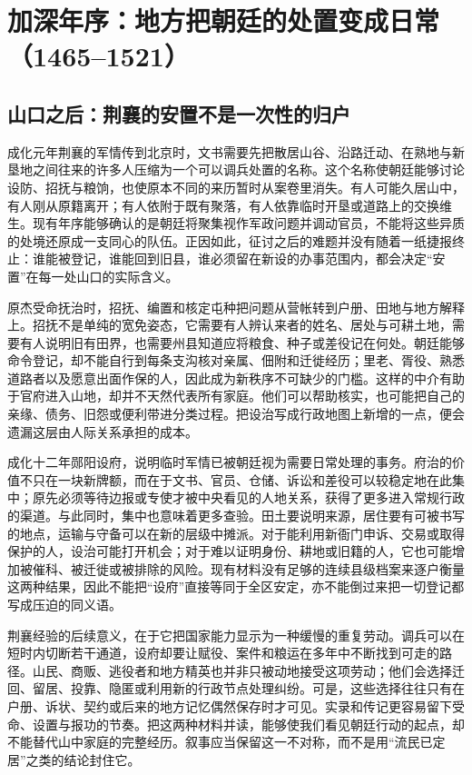 \section{加深年序：地方把朝廷的处置变成日常（1465--1521）}

\subsection{山口之后：荆襄的安置不是一次性的归户}

成化元年荆襄的军情传到北京时，文书需要先把散居山谷、沿路迁动、在熟地与新垦地之间往来的许多人压缩为一个可以调兵处置的名称。这个名称使朝廷能够讨论设防、招抚与粮饷，也使原本不同的来历暂时从案卷里消失。有人可能久居山中，有人刚从原籍离开；有人依附于既有聚落，有人依靠临时开垦或道路上的交换维生。现有年序能够确认的是朝廷将聚集视作军政问题并调动官员，不能将这些异质的处境还原成一支同心的队伍。正因如此，征讨之后的难题并没有随着一纸捷报终止：谁能被登记，谁能回到旧县，谁必须留在新设的办事范围内，都会决定“安置”在每一处山口的实际含义。

原杰受命抚治时，招抚、编置和核定屯种把问题从营帐转到户册、田地与地方解释上。招抚不是单纯的宽免姿态，它需要有人辨认来者的姓名、居处与可耕土地，需要有人说明旧有田界，也需要州县知道应将粮食、种子或差役记在何处。朝廷能够命令登记，却不能自行到每条支沟核对亲属、佃附和迁徙经历；里老、胥役、熟悉道路者以及愿意出面作保的人，因此成为新秩序不可缺少的门槛。这样的中介有助于官府进入山地，却并不天然代表所有家庭。他们可以帮助核实，也可能把自己的亲缘、债务、旧怨或便利带进分类过程。把设治写成行政地图上新增的一点，便会遗漏这层由人际关系承担的成本。

成化十二年郧阳设府，说明临时军情已被朝廷视为需要日常处理的事务。府治的价值不只在一块新牌额，而在于文书、官员、仓储、诉讼和差役可以较稳定地在此集中；原先必须等待边报或专使才被中央看见的人地关系，获得了更多进入常规行政的渠道。与此同时，集中也意味着更多查验。田土要说明来源，居住要有可被书写的地点，运输与守备可以在新的层级中摊派。对于能利用新衙门申诉、交易或取得保护的人，设治可能打开机会；对于难以证明身份、耕地或旧籍的人，它也可能增加被催科、被迁徙或被排除的风险。现有材料没有足够的连续县级档案来逐户衡量这两种结果，因此不能把“设府”直接等同于全区安定，亦不能倒过来把一切登记都写成压迫的同义语。

荆襄经验的后续意义，在于它把国家能力显示为一种缓慢的重复劳动。调兵可以在短时内切断若干通道，设府却要让赋役、案件和粮运在多年中不断找到可走的路径。山民、商贩、逃役者和地方精英也并非只被动地接受这项劳动；他们会选择迁回、留居、投靠、隐匿或利用新的行政节点处理纠纷。可是，这些选择往往只有在户册、诉状、契约或后来的地方记忆偶然保存时才可见。实录和传记更容易留下受命、设置与报功的节奏。把这两种材料并读，能够使我们看见朝廷行动的起点，却不能替代山中家庭的完整经历。叙事应当保留这一不对称，而不是用“流民已定居”之类的结论封住它。

